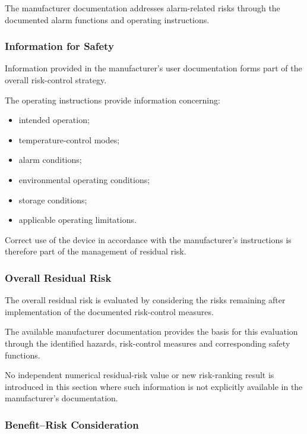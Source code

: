 The manufacturer documentation addresses alarm-related risks through the
documented alarm functions and operating instructions.

\subsubsection{Information for Safety}

Information provided in the manufacturer's user documentation forms part of
the overall risk-control strategy.

The operating instructions provide information concerning:

\begin{itemize}

    \item intended operation;

    \item temperature-control modes;

    \item alarm conditions;

    \item environmental operating conditions;

    \item storage conditions;

    \item applicable operating limitations.

\end{itemize}

Correct use of the device in accordance with the manufacturer's instructions
is therefore part of the management of residual risk.

\subsubsection{Overall Residual Risk}

The overall residual risk is evaluated by considering the risks remaining
after implementation of the documented risk-control measures.

The available manufacturer documentation provides the basis for this
evaluation through the identified hazards, risk-control measures and
corresponding safety functions.

No independent numerical residual-risk value or new risk-ranking result is
introduced in this section where such information is not explicitly
available in the manufacturer's documentation.

\subsubsection{Benefit--Risk Consideration}

